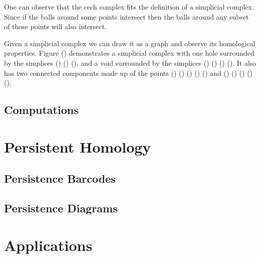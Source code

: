 One can observe that the cech complex fits the definition of a simplicial complex.
Since if the balls around some points intersect then the balls around any subset of those points will also intersect.

Given a simplicial complex we can draw it as a graph and observe its homological properties.
Figure () demonstrates a simplicial complex with one hole surrounded by the simplices () () (), and a void surrounded by the simplices () () () ().
It also has two connected components made up of the points () () () () () and () () () () ().

\subsection{Computations}

\section{Persistent Homology}\label{sec:persistent-homology}

\subsection{Persistence Barcodes}

\subsection{Persistence Diagrams}

\section{Applications}\label{sec:applications}

\newpage





